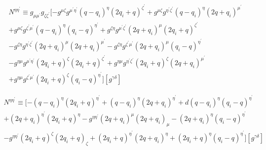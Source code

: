 \begin{equation}
\begin{split}
N^{{\eta}{{\eta}^{\prime}}}\equiv g_{{\mu}{{\mu}^{\prime}}} g_{{\zeta}{{\zeta}^{\prime}}}[-g^{{\mu}{\zeta}}g^{{{\mu}^{\prime}}{{\eta}^{\prime}}}(q-q_i)^{{\eta}}(2q_i+q)^{{\zeta}^{\prime}}+g^{{\mu}{\zeta}}g^{{{\eta}^{\prime}}{{\zeta}^{\prime}}}(q-q_i)^{\eta}(2q +q_i)^{{\mu}^{\prime}}\\+g^{{\mu}{\zeta}}g^{{{\zeta}^{\prime}}{{\mu}^{\prime}}}(q-q_i)^{\eta}(q_i -q)^{{\eta}^{\prime}}+g^{{\zeta}{\eta}}g^{{{\mu}^{\prime}}{{\zeta}^{\prime}}}(2q +q_i)^{\mu}(2q_i+q)^{{\zeta}^{\prime}}\\
-g^{{\zeta}{\eta}}g^{{{\eta}^{\prime}}{{\zeta}^{\prime}}}(2q +q_i)^{\mu}(2q +q_i)^{{\mu}^{\prime}}-g^{{\zeta}{\eta}}g^{{{\zeta}^{\prime}}{{\mu}^{\prime}}}(2q +q_i)^{\mu}(q_i -q)^{{\eta}^{\prime}}\\
-g^{{\eta}{\mu}}g^{{{\mu}^{\prime}}{{\eta}^{\prime}}}(2q_i +q)^{\zeta}(2q_i+q)^{{\zeta}^{\prime}}+g^{{\eta}{\mu}}g^{{{\eta}^{\prime}}{{\zeta}^{\prime}}}(2q_i +q)^{\zeta}(2q +q_i)^{{\mu}^{\prime}}\\
+g^{{\eta}{\mu}}g^{{{\zeta}^{\prime}}{{\mu}^{\prime}}}(2q_i +q)^{\zeta}(q_i -q)^{{\eta}^{\prime}}][g^{{\gamma}{\delta}}]
\end{split}
\end{equation}


\begin{equation}
\begin{split}
N^{{\eta}{{\eta}^{\prime}}}\equiv [-(q-q_i)^{{\eta}}(2q_i+q)^{{\eta}^{\prime}}+(q-q_i)^{\eta}(2q +q_i)^{{\eta}^{\prime}}+d(q-q_i)^{\eta}(q_i -q)^{{\eta}^{\prime}}\\+(2q +q_i)^{{\eta}^{\prime}}(2q_i+q)^{{\eta}}
-g^{{\eta}{{\eta}^{\prime}}}(2q +q_i)^{\mu}(2q +q_i)_{{\mu}}-(2q +q_i)^{\eta}(q_i -q)^{{\eta}^{\prime}}\\
-g^{{\eta}{{\eta}^{\prime}}}(2q_i +q)^{\zeta}(2q_i+q)_{{\zeta}}+(2q_i +q)^{{\eta}^{\prime}}(2q +q_i)^{{\eta}}
+(2q_i +q)^{\eta}(q_i -q)^{{\eta}^{\prime}}][g^{{\gamma}{\delta}}]
\end{split}
\end{equation}

